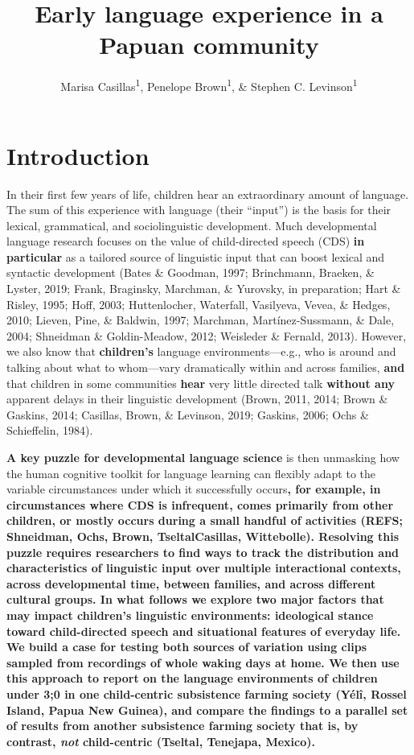 \documentclass[,man,floatsintext]{apa6}
\title{Early language experience in a Papuan community}
\author{Marisa Casillas\textsuperscript{1}, Penelope Brown\textsuperscript{1},
\& Stephen C. Levinson\textsuperscript{1}}
\date{}
\affiliation{
\vspace{0.5cm}
\textsuperscript{1} Max Planck Institute for Psycholinguistics}
\begin{document}
\maketitle

\section{Introduction}\label{intro}

In their first few years of life, children hear an extraordinary amount
of language. The sum of this experience with language (their
\enquote{input}) is the basis for their lexical, grammatical, and
sociolinguistic development. Much developmental language research
focuses on the value of child-directed speech (CDS) \textbf{in
particular} as a tailored source of linguistic input that can boost
lexical and syntactic development (Bates \& Goodman, 1997; Brinchmann,
Braeken, \& Lyster, 2019; Frank, Braginsky, Marchman, \& Yurovsky, in
preparation; Hart \& Risley, 1995; Hoff, 2003; Huttenlocher, Waterfall,
Vasilyeva, Vevea, \& Hedges, 2010; Lieven, Pine, \& Baldwin, 1997;
Marchman, Martínez-Sussmann, \& Dale, 2004; Shneidman \& Goldin-Meadow,
2012; Weisleder \& Fernald, 2013). However, we also know that
\textbf{children's} language environments---e.g., who is around and
talking about what to whom---vary dramatically within and across
families, \textbf{and} that children in some communities \textbf{hear}
very little directed talk \textbf{without any} apparent delays in their
linguistic development (Brown, 2011, 2014; Brown \& Gaskins, 2014;
Casillas, Brown, \& Levinson, 2019; Gaskins, 2006; Ochs \& Schieffelin,
1984).

\textbf{A key puzzle for developmental language science} is then
unmasking how the human cognitive toolkit for language learning can
flexibly adapt to the variable circumstances under which it successfully
occurs\textbf{, for example, in circumstances where CDS is infrequent,
comes primarily from other children, or mostly occurs during a small
handful of activities (REFS; Shneidman, Ochs, Brown, TseltalCasillas,
Wittebolle). Resolving this puzzle requires researchers to find ways to
track the distribution and characteristics of linguistic input over
multiple interactional contexts, across developmental time, between
families, and across different cultural groups. In what follows we
explore two major factors that may impact children's linguistic
environments: ideological stance toward child-directed speech and
situational features of everyday life. We build a case for testing both
sources of variation using clips sampled from recordings of whole waking
days at home. We then use this approach to report on the language
environments of children under 3;0 in one child-centric subsistence
farming society (Yélî, Rossel Island, Papua New Guinea), and compare the
findings to a parallel set of results from another subsistence farming
society that is, by contrast, \emph{not} child-centric (Tseltal,
Tenejapa, Mexico).}
\end{document}
